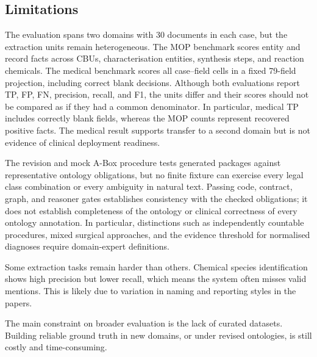\subsection{Limitations}\label{subsec:limitations}
The evaluation spans two domains with 30 documents in each case, but the extraction units remain heterogeneous. The MOP benchmark scores entity and record facts across CBUs, characterisation entities, synthesis steps, and reaction chemicals. The medical benchmark scores all case--field cells in a fixed 79-field projection, including correct blank decisions. Although both evaluations report TP, FP, FN, precision, recall, and F1, the units differ and their scores should not be compared as if they had a common denominator. In particular, medical TP includes correctly blank fields, whereas the MOP counts represent recovered positive facts. The medical result supports transfer to a second domain but is not evidence of clinical deployment readiness.

The revision and mock A-Box procedure tests generated packages against representative ontology obligations, but no finite fixture can exercise every legal class combination or every ambiguity in natural text. Passing code, contract, graph, and reasoner gates establishes consistency with the checked obligations; it does not establish completeness of the ontology or clinical correctness of every ontology annotation. In particular, distinctions such as independently countable procedures, mixed surgical approaches, and the evidence threshold for normalised diagnoses require domain-expert definitions.

Some extraction tasks remain harder than others. Chemical species identification shows high precision but lower recall, which means the system often misses valid mentions. This is likely due to variation in naming and reporting styles in the papers.

The main constraint on broader evaluation is the lack of curated datasets. Building reliable ground truth in new domains, or under revised ontologies, is still costly and time-consuming.



